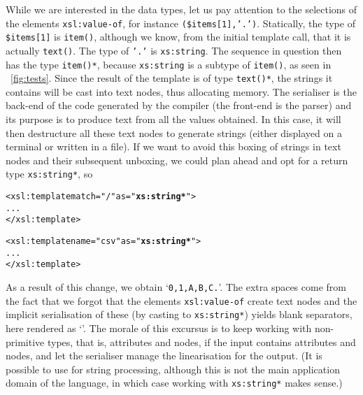 While we are interested in the data types, let us pay attention to the
selections of the elements \texttt{xsl:value-of}, for instance
\texttt{(\$items[1],'.')}. Statically, the type of \texttt{\$items[1]}
is \texttt{item()}, although we know, from the initial template call,
that it is actually \texttt{text()}. The type of \texttt{'.'} is
\texttt{xs:string}. The sequence in question then has the type
\texttt{item()*}, because \texttt{xs:string} is a subtype of
\texttt{item()}, as seen in \fig~\vref{fig:tests}. Since the result of
the template is of type \texttt{text()*}, the strings it contains will
be cast into text nodes, thus allocating memory. The serialiser is the
back\hyp{}end of the code generated by the \XSLT compiler (the
front\hyp{}end is the \XML parser) and its purpose is to produce text
from all the values obtained. In this case, it will then destructure
all these text nodes to generate strings (either displayed on a
terminal or written in a file). If we want to avoid this boxing of
strings in text nodes and their subsequent unboxing, we could plan
ahead and opt for a return type \texttt{xs:string*}, so
\begin{alltt}
  <xsl:template match="/" as="\textbf{xs:string*}">
    ...
  </xsl:template>

  <xsl:template name="csv" as="\textbf{xs:string*}">
    ...
  </xsl:template>
\end{alltt}
As a result of this change, we obtain
`\texttt{0,\textvisiblespace{}1,\textvisiblespace{}A,\textvisiblespace{}B,\textvisiblespace{}C.}'. The
extra spaces come from the fact that we forgot that the elements
\texttt{xsl:value-of} create text nodes and the implicit serialisation
of these (by casting to \texttt{xs:string*}) yields blank separators,
here rendered as `\texttt{\textvisiblespace}'. The morale of this
excursus is to keep working with non\hyp{}primitive types, that is,
attributes and nodes, if the input contains attributes and nodes, and
let the serialiser manage the linearisation for the output. (It is
possible to use \XSLT for string processing, although this is not the
main application domain of the language, in which case working with
\texttt{xs:string*} makes sense.)

